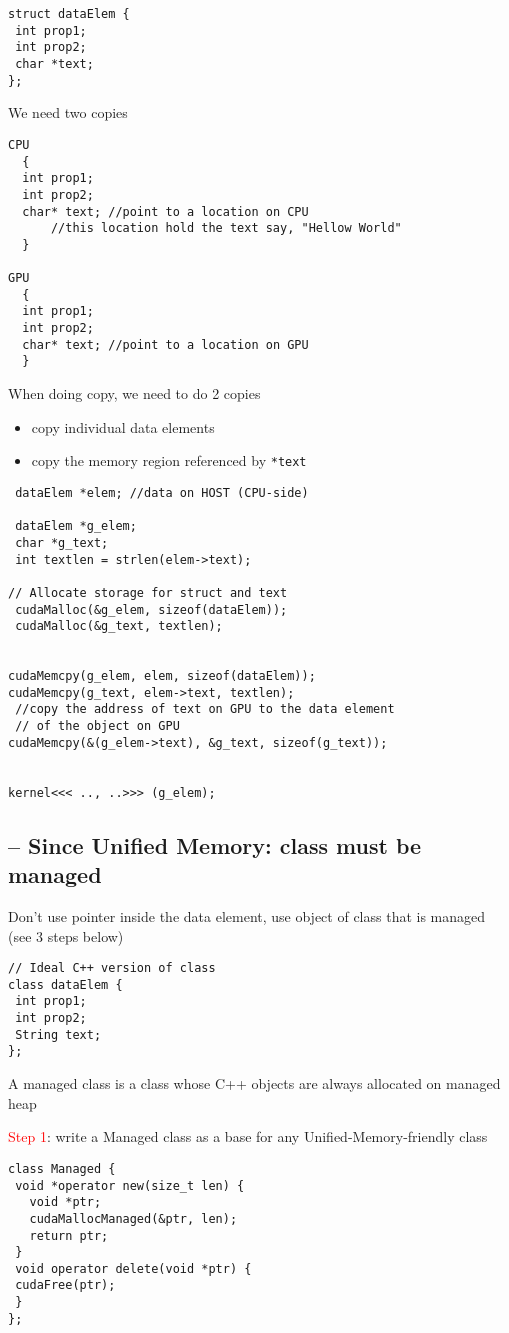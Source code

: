 \begin{verbatim}
struct dataElem {
 int prop1;
 int prop2;
 char *text;
};
\end{verbatim}
We need two copies
\begin{verbatim}
CPU
  {
  int prop1;
  int prop2;
  char* text; //point to a location on CPU 
      //this location hold the text say, "Hellow World"
  }
  
GPU
  {
  int prop1;
  int prop2;
  char* text; //point to a location on GPU
  }
\end{verbatim}
When doing copy, we need to do 2 copies
\begin{itemize}
  \item copy individual data elements
  
  \item copy the memory region referenced by \verb!*text!
\end{itemize}
\begin{verbatim}
 dataElem *elem; //data on HOST (CPU-side)

 dataElem *g_elem;
 char *g_text;
 int textlen = strlen(elem->text);
 
// Allocate storage for struct and text
 cudaMalloc(&g_elem, sizeof(dataElem));
 cudaMalloc(&g_text, textlen);
 

cudaMemcpy(g_elem, elem, sizeof(dataElem));
cudaMemcpy(g_text, elem->text, textlen);
 //copy the address of text on GPU to the data element
 // of the object on GPU
cudaMemcpy(&(g_elem->text), &g_text, sizeof(g_text));
 
 
kernel<<< .., ..>>> (g_elem);
\end{verbatim}


\subsection{-- Since Unified Memory: class must be managed}

Don't use pointer inside the data element, use object of class that is managed (see 3 steps below)
\begin{verbatim}
// Ideal C++ version of class
class dataElem {
 int prop1;
 int prop2;
 String text;
};

\end{verbatim}

A managed class is a class whose C++ objects are always allocated on managed heap

\textcolor{red}{Step 1}: write a Managed class as a base for any Unified-Memory-friendly class
\begin{verbatim}
class Managed {
 void *operator new(size_t len) {
   void *ptr;
   cudaMallocManaged(&ptr, len);
   return ptr;
 }
 void operator delete(void *ptr) {
 cudaFree(ptr);
 }
};
\end{verbatim}

